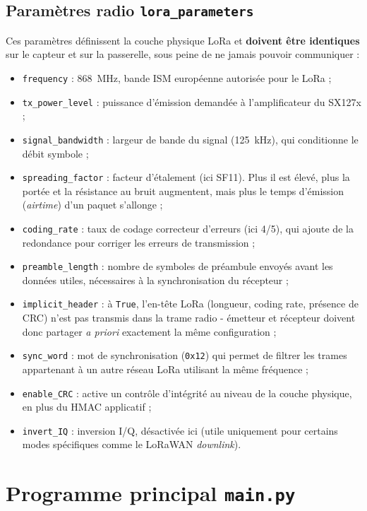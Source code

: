 \documentclass[a4paper,11pt]{report}
\begin{document}
\subsection{Paramètres radio \texttt{lora\_parameters}}
Ces paramètres définissent la couche physique LoRa et \textbf{doivent être identiques} sur le capteur
et sur la passerelle, sous peine de ne jamais pouvoir communiquer :
\begin{itemize}
    \item \texttt{frequency} : \SI{868}{\mega\hertz}, bande ISM européenne autorisée pour le LoRa ;
    \item \texttt{tx\_power\_level} : puissance d'émission demandée à l'amplificateur du SX127x ;
    \item \texttt{signal\_bandwidth} : largeur de bande du signal (\SI{125}{\kilo\hertz}), qui conditionne
    le débit symbole ;
    \item \texttt{spreading\_factor} : facteur d'étalement (ici SF11). Plus il est élevé, plus la portée
    et la résistance au bruit augmentent, mais plus le temps d'émission (\emph{airtime}) d'un paquet
    s'allonge ;
    \item \texttt{coding\_rate} : taux de codage correcteur d'erreurs (ici 4/5), qui ajoute de la
    redondance pour corriger les erreurs de transmission ;
    \item \texttt{preamble\_length} : nombre de symboles de préambule envoyés avant les données utiles,
    nécessaires à la synchronisation du récepteur ;
    \item \texttt{implicit\_header} : à \texttt{True}, l'en-tête LoRa (longueur, coding rate, présence de
    CRC) n'est pas transmis dans la trame radio - émetteur et récepteur doivent donc partager
    \emph{a priori} exactement la même configuration ;
    \item \texttt{sync\_word} : mot de synchronisation (\texttt{0x12}) qui permet de filtrer les trames
    appartenant à un autre réseau LoRa utilisant la même fréquence ;
    \item \texttt{enable\_CRC} : active un contrôle d'intégrité au niveau de la couche physique, en plus
    du HMAC applicatif ;
    \item \texttt{invert\_IQ} : inversion I/Q, désactivée ici (utile uniquement pour certains modes
    spécifiques comme le LoRaWAN \emph{downlink}).
\end{itemize}

\section{Programme principal \texttt{main.py}}
\end{document}
